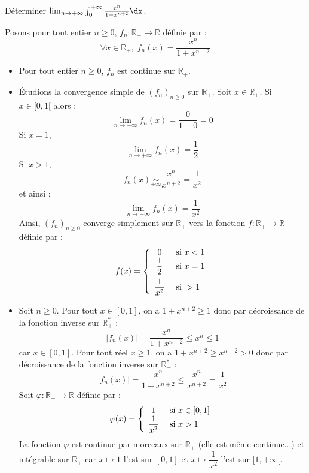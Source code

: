 \documentclass[a4paper,10pt]{report}
\begin{document}
\begin{Exa} Déterminer $\lim_{n \rightarrow + \infty}\int_{0}^{ + \infty} \frac{x^{n}}{1 + x^{n + 2}} \dx$.
\end{Exa}

\corr Posons pour tout entier $n \geq 0$, $f_n : \mathbb{R}_+ \rightarrow \mathbb{R}$ définie par :
$$ \forall x \in \mathbb{R}_+, \; f_n(x) = \frac{x^{n}}{1 + x^{n + 2}}$$
\begin{itemize}
\item Pour tout entier $n \geq 0$, $f_n$ est continue sur $\mathbb{R}_+$.
\item Étudions la convergence simple de $(f_n)_{n \geq 0}$ sur $\mathbb{R}_+$. Soit $x \in \mathbb{R}_+$. Si $x \in [0,1[$ alors :
$$ \lim_{n \rightarrow + \infty} f_n(x)= \dfrac{0}{1+0} = 0$$
Si $x=1$,
$$ \lim_{n \rightarrow + \infty} f_n(x)= \dfrac{1}{2}$$
Si $x>1$,
$$ f_n(x) \underset{+ \infty}{\sim} \dfrac{x^n}{x^{n+2}} = \dfrac{1}{x^2}$$
et ainsi :
$$ \lim_{n \rightarrow + \infty} f_n(x) = \dfrac{1}{x^2}$$
Ainsi, $(f_n)_{n \geq 0}$ converge simplement sur $\mathbb{R}_+$ vers la fonction $f : \mathbb{R}_+ \rightarrow \mathbb{R}$ définie par :
$$ f(x) = \left\lbrace \begin{array}{cl}
0 & \hbox{ si } x<1 \\
\dfrac{1}{2} & \hbox{ si } x=1 \\[0.3cm]
\dfrac{1}{x^2} & \hbox{ si } >1  
\end{array}\right.$$
\item Soit $n \geq 0$. Pour tout $x \in [0,1]$, on a $1+x^{n+2}\geq 1$ donc par décroissance de la fonction inverse sur $\mathbb{R}_+^*$ :
$$ \left\vert f_n(x) \right\vert = \dfrac{x^n}{1+x^{n+2}} \leq  x^n \leq 1$$
car $x \in [0,1]$. Pour tout réel $x\geq 1$, on a $1+x^{n+2}\geq x^{n+2}>0$ donc par décroissance de la fonction inverse sur $\mathbb{R}_+^*$ :
$$ \left\vert f_n(x) \right\vert = \dfrac{x^n}{1+x^{n+2}} \leq \dfrac{x^n}{x^{n+2}}= \dfrac{1}{x^2}$$
Soit $\varphi : \mathbb{R}_+ \rightarrow \mathbb{R}$ définie par :
$$ \varphi(x) = \left\lbrace \begin{array}{cl}
1 & \hbox{ si } x \in [0,1] \\
\dfrac{1}{x^2} & \hbox{ si } x>1 \\
\end{array}\right.$$
La fonction $\varphi$ est continue par morceaux sur $\mathbb{R}_+$ (elle est même continue...) et intégrable sur $\mathbb{R}_+$ car $x \mapsto 1$ l'est sur $[0,1]$ et $x \mapsto \dfrac{1}{x^2}$ l'est sur $[1, + \infty[$. 
\end{itemize}
\end{document}
